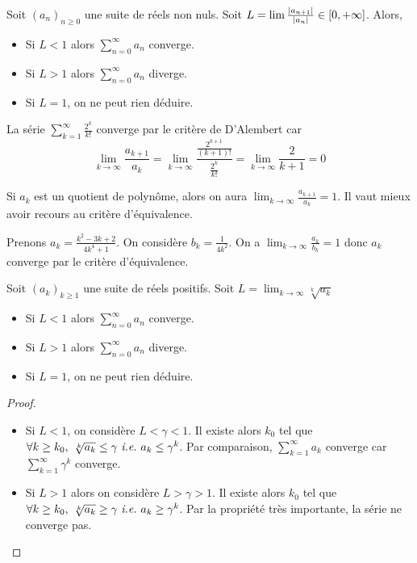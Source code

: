 \begin{corollaire}
    Soit $(a_n)_{n\ge 0}$ une suite de réels non nuls. Soit $L = \lim \frac{\left| a_{n+1} \right|}{\left| a_n \right|}\in[0,+\infty]$. Alors,\begin{itemize}
        \item Si $L<1$ alors $\sum_{n = 0}^\infty a_n$ converge.
        \item Si $L>1$ alors $\sum_{n = 0}^\infty a_n$ diverge.
        \item Si $L=1$, on ne peut rien déduire.
    \end{itemize}
\end{corollaire}
\begin{exemple}
    La série $\sum_{k=1}^\infty\frac{2^k}{k!}$ converge par le critère de D'Alembert car $$\lim_{k\to\infty}\frac{a_{k+1}}{a_k} = \lim_{k\to\infty}\frac{\frac{2^{k+1}}{(k+1)!}}{\frac{2^k}{k!}} = \lim_{k\to\infty}\frac{2}{k+1} = 0$$
\end{exemple}
\begin{remarque}
    Si $a_k$ est un quotient de polynôme, alors on aura $\lim_{k\to\infty}\frac{a_{k+1}}{a_k} = 1$. Il vaut mieux avoir recours au critère d'équivalence.
\end{remarque}
\begin{exemple}
    Prenons $a_k = \frac{k^2 - 3k+ 2}{4k^4+1}$. On considère $b_k = \frac{1}{4k^2}$. On a $\lim_{k\to\infty} \frac{a_k}{b_k} = 1$ donc $a_k$ converge par le critère d'équivalence. 
\end{exemple}
\begin{proposition}
Soit $(a_k)_{k\ge 1}$ une suite de réels positifs. Soit $L = \lim_{k\to\infty}\sqrt[k]{a_k}$
\begin{itemize}
    \item Si $L<1$ alors $\sum_{n = 0}^\infty a_n$ converge.
    \item Si $L>1$ alors $\sum_{n = 0}^\infty a_n$ diverge.
    \item Si $L=1$, on ne peut rien déduire.
\end{itemize}
\end{proposition}
\begin{proof}
    \begin{itemize}
        \item Si $L<1$, on considère $L<\gamma<1$. Il existe alors $k_0$ tel que $\forall k \ge k_0,\ \sqrt[k]{a_k}\le \gamma\ \textit{i.e.}\ a_k\le\gamma^k$. Par comparaison, $\sum_{k = 1}^\infty a_k$ converge car $\sum_{k = 1}^\infty \gamma^k$ converge.
        \item Si $L>1$ alors on considère $L>\gamma>1$. Il existe alors $k_0$ tel que $\forall k\ge k_0,\ \sqrt[k]{a_k}\ge\gamma \ \ie\ a_k\ge\gamma ^k$. Par la propriété très importante, la série ne converge pas.
    \end{itemize}
\end{proof}
